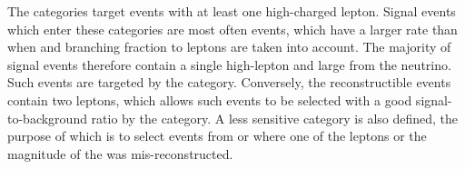 The \VHLeptonicTag categories target events with at least one high-\pT charged lepton. Signal events which enter these categories are most often \WH events, which have a larger rate than \ZH when \crosssection and branching fraction to leptons are taken into account. The majority of signal events therefore contain a single high-\pT lepton and large \MET from the neutrino. Such events are targeted by the \WHLeptonicTag category. Conversely, the reconstructible \ZH events contain two leptons, which allows such events to be selected with a good signal-to-background ratio by the \ZHLeptonicTag category. A less sensitive \VHLeptonicLooseTag category is also defined, the purpose of which is to select events from \WH or \ZH where one of the leptons or the magnitude of the \MET was mis-reconstructed. 

